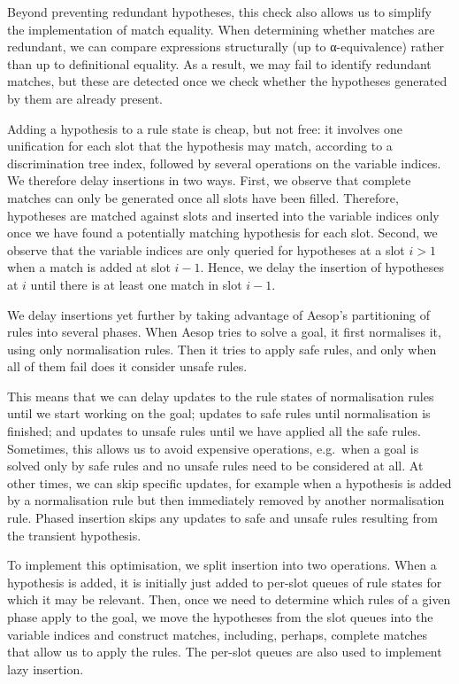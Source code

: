 Beyond preventing redundant hypotheses, this check also allows us to simplify the implementation of match equality.
When determining whether matches are redundant, we can compare expressions structurally (up to α-equivalence) rather than up to definitional equality.
As a result, we may fail to identify redundant matches, but these are detected once we check whether the hypotheses generated by them are already present.

Adding a hypothesis to a rule state is cheap, but not free: it involves one unification for each slot that the hypothesis may match, according to a discrimination tree index, followed by several operations on the variable indices.
We therefore delay insertions in two ways.
First, we observe that complete matches can only be generated once all slots have been filled.
Therefore, hypotheses are matched against slots and inserted into the variable indices only once we have found a potentially matching hypothesis for each slot.
Second, we observe that the variable indices are only queried for hypotheses at a slot $i > 1$ when a match is added at slot $i - 1$.
Hence, we delay the insertion of hypotheses at $i$ until there is at least one match in slot $i - 1$.

We delay insertions yet further by taking advantage of Aesop's partitioning of rules into several phases.
When Aesop tries to solve a goal, it first normalises it, using only normalisation rules.
Then it tries to apply safe rules, and only when all of them fail does it consider unsafe rules.

This means that we can delay updates to the rule states of normalisation rules until we start working on the goal; updates to safe rules until normalisation is finished; and updates to unsafe rules until we have applied all the safe rules.
Sometimes, this allows us to avoid expensive operations, e.g.\ when a goal is solved only by safe rules and no unsafe rules need to be considered at all.
At other times, we can skip specific updates, for example when a hypothesis is added by a normalisation rule but then immediately removed by another normalisation rule.
Phased insertion skips any updates to safe and unsafe rules resulting from the transient hypothesis.

To implement this optimisation, we split insertion into two operations.
When a hypothesis is added, it is initially just added to per-slot queues of rule states for which it may be relevant.
Then, once we need to determine which rules of a given phase apply to the goal, we move the hypotheses from the slot queues into the variable indices and construct matches, including, perhaps, complete matches that allow us to apply the rules.
The per-slot queues are also used to implement lazy insertion.

